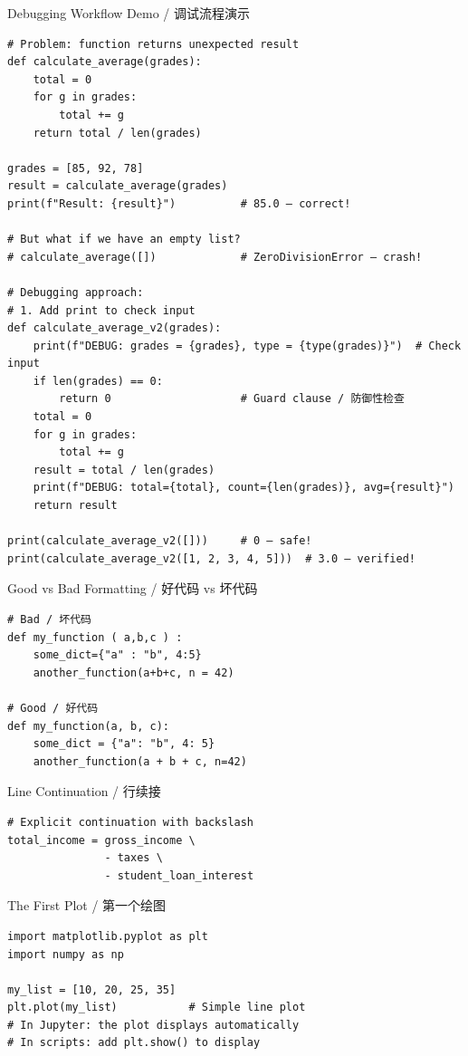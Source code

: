 \documentclass[11pt,a4paper]{report}
\begin{document}
\begin{examplebox}{Debugging Workflow Demo / 调试流程演示}
\begin{lstlisting}
# Problem: function returns unexpected result
def calculate_average(grades):
    total = 0
    for g in grades:
        total += g
    return total / len(grades)

grades = [85, 92, 78]
result = calculate_average(grades)
print(f"Result: {result}")          # 85.0 — correct!

# But what if we have an empty list?
# calculate_average([])             # ZeroDivisionError — crash!

# Debugging approach:
# 1. Add print to check input
def calculate_average_v2(grades):
    print(f"DEBUG: grades = {grades}, type = {type(grades)}")  # Check input
    if len(grades) == 0:
        return 0                    # Guard clause / 防御性检查
    total = 0
    for g in grades:
        total += g
    result = total / len(grades)
    print(f"DEBUG: total={total}, count={len(grades)}, avg={result}")
    return result

print(calculate_average_v2([]))     # 0 — safe!
print(calculate_average_v2([1, 2, 3, 4, 5]))  # 3.0 — verified!
\end{lstlisting}
\end{examplebox}

\begin{examplebox}{Good vs Bad Formatting / 好代码 vs 坏代码}
\begin{lstlisting}
# Bad / 坏代码
def my_function ( a,b,c ) :
    some_dict={"a" : "b", 4:5}
    another_function(a+b+c, n = 42)

# Good / 好代码
def my_function(a, b, c):
    some_dict = {"a": "b", 4: 5}
    another_function(a + b + c, n=42)
\end{lstlisting}
\end{examplebox}

\begin{examplebox}{Line Continuation / 行续接}
\begin{lstlisting}
# Explicit continuation with backslash
total_income = gross_income \
               - taxes \
               - student_loan_interest
\end{lstlisting}
\end{examplebox}

\begin{examplebox}{The First Plot / 第一个绘图}
\begin{lstlisting}
import matplotlib.pyplot as plt
import numpy as np

my_list = [10, 20, 25, 35]
plt.plot(my_list)           # Simple line plot
# In Jupyter: the plot displays automatically
# In scripts: add plt.show() to display
\end{lstlisting}
\end{examplebox}
\end{document}
